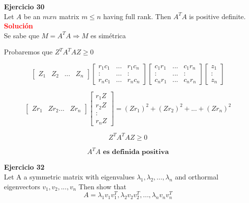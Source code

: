 \documentclass[12pt]{article}
\begin{document}
\noindent \textbf{Ejercicio 30}\\
Let $A$ be an $m x n$ matrix $m \leq n$ having full rank. Then $A^TA$ is positive definite.\\

\noindent \textcolor{red}{\bf Solución}\\
Se sabe que $M = A^TA \Rightarrow M$ es simétrica 

Probaremos que $Z^TA^TAZ\geq0$

\[ \left[\begin{array}{cccc}Z_1 & Z_2 &... & Z_n \end{array}\right] \left[ \begin{array}{ccc}
r_1c_1 & ... & r_1c_n \\
:    & ... & : \\
r_nc_1 & ... & r_nc_n \end{array} \right]\left[ \begin{array}{ccc}
c_1r_1 & ... & c_1r_n \\
:    & ... & : \\
c_nr_1 & ... & c_nr_n \end{array} \right]\left[ \begin{array}{c}
z_1\\
: \\
z_n \end{array} \right]\] 

\[\left[ \begin{array}{cccc}
Zr_1 & Zr_2... & Zr_n  \end{array} \right]\left[ \begin{array}{c}
r_1Z\\
r_2Z\\
:  \\
r_nZ \end{array} \right] = (Zr_1)^2 + (Zr_2)^2 + ... + (Zr_n)^2 \]

\[Z^TA^TAZ \geq 0\]

\[A^TA \textbf{ es definida positiva}\]

\noindent \textbf{Ejercicio 32}\\
Let A a symmetric matrix with eigenvalues $\lambda_1,\lambda_2,...,\lambda_n$ and orthormal eigenvectors $v_1,v_2,...,v_n$ Then show that $$A=\lambda_1v_1v_1^T,\lambda_2v_2v_2^T,...,\lambda_nv_nv_n^T$$
\end{document}

